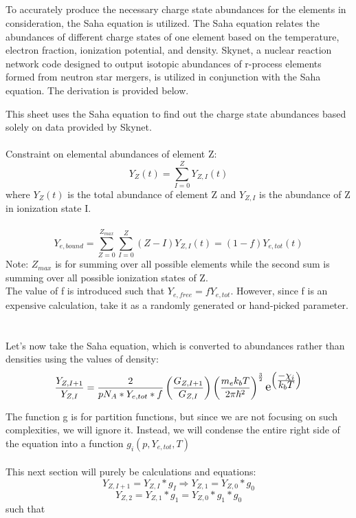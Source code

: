 \documentclass[11pt,a4paper]{article}
\begin{document}
\\\\
\\\\
To accurately produce the necessary charge state abundances for the elements in consideration, the Saha equation is utilized. The Saha equation relates the abundances of different charge states of one element based on the temperature, electron fraction, ionization potential, and density. Skynet, a nuclear reaction network code designed to output isotopic abundances of r-process elements formed from neutron star mergers, is utilized in conjunction with the Saha equation. The derivation is provided below. \newpage

\maketitle   This sheet uses the Saha equation to find out the charge state abundances based solely on data provided by Skynet.
\\
\\
Constraint on elemental abundances of element Z:
$$Y_Z (t) = \sum_{I=0}^{Z} Y_{Z,I}(t)$$
where $Y_Z (t)$ is the total abundance of element Z and $Y_{Z,I}$ is the abundance of Z in ionization state I.
\\
\\
$$Y_{e,bound} = \sum_{Z=0}^{Z_{max}} \sum_{I=0}^{Z} (Z - I) Y_{Z,I}(t) = (1-f) Y_{e,tot}(t) $$
Note: $Z_{max}$ is for summing over all possible elements while the second sum is summing over all possible ionization states of Z. 
\\The value of f is introduced such that $Y_{e,free} = f Y_{e,tot}$. However, since f is an expensive calculation, take it as a randomly generated or hand-picked parameter. 
\\\\\\Let's now take the Saha equation, which is converted to abundances rather than densities using the values of density: $$\frac{Y_{Z,I+1}}{Y_{Z,I}}  = \frac{2}{pN_A * Y_{e,tot}*f}  \left(\frac{G_{Z,I+1}}{G_{Z,I}}\right) \left(\frac{m_e k_b T}{2\pi\hbar^2}\right)^\frac{3}{2} \scalebox{1.3} e^{\left(\frac{\displaystyle -\chi_i}{\displaystyle k_b T}\right)} $$


The function g is for partition functions, but since we are not focusing on such complexities, we will ignore it. Instead, we will condense the entire right side of the equation into a function $g_i (p,Y_{e,tot},T) $
\\\\
This next section will purely be calculations and equations: $$ Y_{Z,I+1} = Y_{Z,I} * g_I \Longrightarrow  Y_{Z,1} = Y_{Z,0}*g_0 $$   $$ Y_{Z,2} = Y_{Z,1}*g_1 = Y_{Z,0}*g_1 * g_0 $$
such that 
\end{document}
